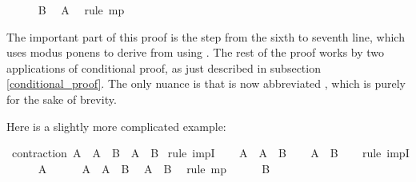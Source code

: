 \begin{isabellebody}
\ \ \ \ \isamarkupfalse%
\ {\isachardoublequoteopen}B{\isachardoublequoteclose}\ \isamarkupfalse%
\ {\isacharbackquoteopen}A{\isacharbackquoteclose}\ \isamarkupfalse%
\ {\isacharparenleft}rule\ mp{\isacharparenright}\isanewline
\ \ \isamarkupfalse%
\isanewline
{}\isamarkupfalse%
%
\endisatagproof
{\isafoldproof}%
%
\isadelimproof
%
\endisadelimproof
%
\begin{isamarkuptext}%
The important part of this proof is the step from the sixth to seventh line, which uses
modus ponens to derive  from  using . The rest of the proof
works by two applications of conditional proof, as just described in subsection \ref{conditional_proof}.
The only nuance is that  is now abbreviated , which is purely for
the sake of brevity.%
\end{isamarkuptext}\isamarkuptrue%
%
\begin{isamarkuptext}%
Here is a slightly more complicated example:%
\end{isamarkuptext}\isamarkuptrue%
\isamarkupfalse%
\ contraction{\isacharcolon}\ {\isachardoublequoteopen}{\isacharparenleft}A\ {\isasymlongrightarrow}\ A\ {\isasymlongrightarrow}\ B{\isacharparenright}\ {\isasymlongrightarrow}\ {\isacharparenleft}A\ {\isasymlongrightarrow}\ B{\isacharparenright}{\isachardoublequoteclose}\isanewline
%
\isadelimproof
%
\endisadelimproof
%
\isatagproof
{}\isamarkupfalse%
\ {\isacharparenleft}rule\ impI{\isacharparenright}\isanewline
\ \ \isamarkupfalse%
\ {\isachardoublequoteopen}A\ {\isasymlongrightarrow}\ A\ {\isasymlongrightarrow}\ B{\isachardoublequoteclose}\isanewline
\ \ \isamarkupfalse%
\ {\isachardoublequoteopen}A\ {\isasymlongrightarrow}\ B{\isachardoublequoteclose}\isanewline
\ \ \isamarkupfalse%
\ {\isacharparenleft}rule\ impI{\isacharparenright}\isanewline
\ \ \ \ \isamarkupfalse%
\ {\isachardoublequoteopen}A{\isachardoublequoteclose}\isanewline
\ \ \ \ \isamarkupfalse%
\ {\isacharbackquoteopen}A\ {\isasymlongrightarrow}\ A\ {\isasymlongrightarrow}\ B{\isacharbackquoteclose}\ \isamarkupfalse%
\ {\isachardoublequoteopen}A\ {\isasymlongrightarrow}\ B{\isachardoublequoteclose}\ \isamarkupfalse%
\ {\isacharparenleft}rule\ mp{\isacharparenright}\isanewline
\ \ \ \ \isamarkupfalse%
\ {\isachardoublequoteopen}B{\isachardoublequoteclose}\ \isamarkupfalse%

\end{isabellebody}
